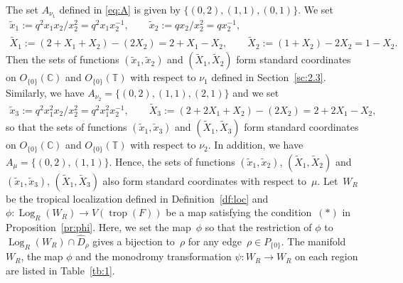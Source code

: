 \documentclass[10pt,a4paper]{amsart}
\numberwithin{equation}{section}
\begin{document}
The set $A_{\nu_1}$ def\/ined in \eqref{eq:A} is given by $\{ (0,2), (1,1), (0,1) \}$. We set
\begin{gather*}
\tilde{x}_1 := q^2x_1x_2/ x_2^2=q^2x_1x_2^{-1}, \qquad \tilde{x}_2:= qx_2/x_2^2=qx_2^{-1}, \\
\widetilde{X}_1 := (2+X_1+X_2)-(2X_2)=2+X_1-X_2, \qquad \widetilde{X}_2:=(1+X_2)-2X_2=1-X_2.
\end{gather*}
Then the sets of functions $(\tilde{x}_1, \tilde{x}_2)$ and $(\widetilde{X}_1, \widetilde{X}_2)$ form standard coordinates on $O_{\{0\}}({\mathbb C})$ and $O_{\{0\}}({\mathbb T})$ with respect to $\nu_1$ def\/ined in Section~\ref{sc:2.3}. Similarly, we have $A_{\nu_2}=\{(0,2), (1,1), (2,1) \}$ and we set
\begin{gather*}
\tilde{x}_3:= q^2x_1^2x_2/x_2^2=q^2x_1^2x_2^{-1}, \qquad \widetilde{X}_3:=(2+2X_1+X_2)-(2X_2)=2+2X_1-X_2,
\end{gather*}
so that the sets of functions $(\tilde{x}_1, \tilde{x}_3)$ and $(\widetilde{X}_1, \widetilde{X}_3)$ form standard coordinates on $O_{\{0\}}({\mathbb C})$ and $O_{\{0\}}({\mathbb T})$ with respect to $\nu_2$. In addition, we have $A_{\mu}=\{ (0,2), (1,1) \}$. Hence, the sets of functions $(\tilde{x}_1, \tilde{x}_2)$, $(\widetilde{X}_1, \widetilde{X}_2)$ and $(\tilde{x}_1, \tilde{x}_3)$, $(\widetilde{X}_1, \widetilde{X}_3)$ also form standard coordinates with respect to~$\mu$. Let~$W_R$ be the tropical localization def\/ined in Def\/inition~\ref{df:loc} and $\phi \colon \operatorname{Log}_R(W_R) \to V(\operatorname{trop}(F))$ be a map satisfying the condition~$(\ast)$ in Proposition~\ref{pr:phi}. Here, we set the map~$\phi$ so that the restriction of $\phi$ to $\operatorname{Log}_R(W_R) \cap \widehat{D}_\rho$ gives a bijection to~$\rho$ for any edge~$\rho \in P_{\{0\}}$. The manifold $W_R$, the map $\phi$ and the monodromy transformation $\psi \colon W_R \to W_R$ on each region are listed in Table~\ref{tb:1}.
\end{document}
